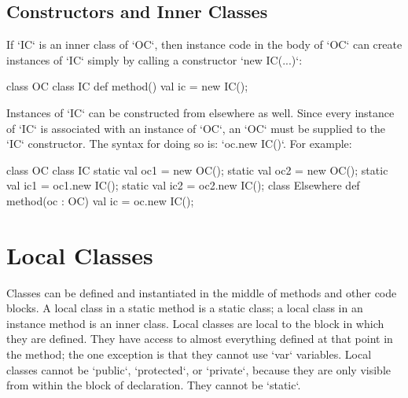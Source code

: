 \subsection{Constructors and Inner Classes}
\label{sect:InnerClassCtor}

If \xcd`IC` is an inner class of \xcd`OC`, then instance code in the body of
\xcd`OC` can create instances of \xcd`IC` simply by calling a constructor
\xcd`new IC(...)`: 
\begin{xten}
class OC {
  class IC {}
  def method(){
    val ic = new IC();
  }
}
\end{xten}
%

Instances of \xcd`IC` can be constructed from elsewhere as well.  Since every
instance of \xcd`IC` is associated with an instance of \xcd`OC`, an \xcd`OC`
must be supplied to the \xcd`IC` constructor.  The syntax for doing so is: 
\xcd`oc.new IC()`.  For example: 
\begin{xten}
class OC {
  class IC {}
  static val oc1 = new OC();
  static val oc2 = new OC();
  static val ic1 = oc1.new IC();
  static val ic2 = oc2.new IC();
}
class Elsewhere{
  def method(oc : OC) {
    val ic = oc.new IC();
  }
}
\end{xten}
%


\section{Local Classes}
\label{sect:LocalClasses}

Classes can be defined and instantiated in the middle of methods and other
code blocks.
A local class in a static method is a static class; a local class in an
instance method is an inner class.
 Local classes are local to the block in which they are defined.
They have access to almost everything defined at that point in the method; the
one exception is that they cannot use \xcd`var` variables. Local classes
cannot be \xcd`public`, \xcd`protected`, or \xcd`private`, because they are
only visible from within the block of declaration. They cannot be
\xcd`static`.

